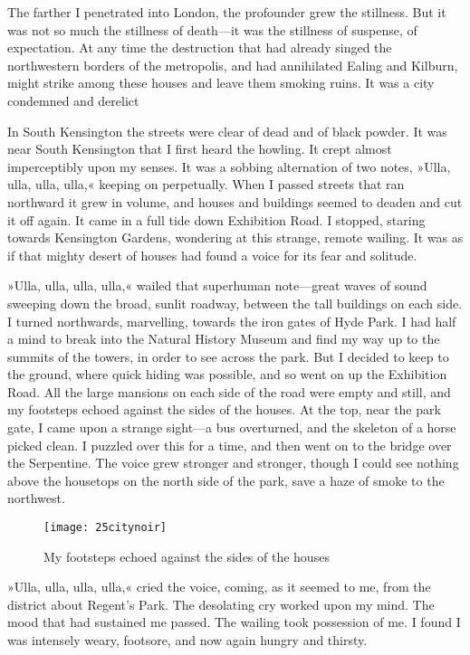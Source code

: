 The farther I penetrated into London, the profounder grew the stillness. But it was not so much the stillness of death—it was the stillness of suspense, of expectation. At any time the destruction that had already singed the northwestern borders of the metropolis, and had annihilated Ealing and Kilburn, might strike among these houses and leave them smoking ruins. It was a city condemned and derelict\textellipsis

In South Kensington the streets were clear of dead and of black powder. It was near South Kensington that I first heard the howling. It crept almost imperceptibly upon my senses. It was a sobbing alternation of two notes, »Ulla, ulla, ulla, ulla,« keeping on perpetually. When I passed streets that ran northward it grew in volume, and houses and buildings seemed to deaden and cut it off again. It came in a full tide down Exhibition Road. I stopped, staring towards Kensington Gardens, wondering at this strange, remote wailing. It was as if that mighty desert of houses had found a voice for its fear and solitude.

»Ulla, ulla, ulla, ulla,« wailed that superhuman note—great waves of sound sweeping down the broad, sunlit roadway, between the tall buildings on each side. I turned northwards, marvelling, towards the iron gates of Hyde Park. I had half a mind to break into the Natural History Museum and find my way up to the summits of the towers, in order to see across the park. But I decided to keep to the ground, where quick hiding was possible, and so went on up the Exhibition Road. All the large mansions on each side of the road were empty and still, and my footsteps echoed against the sides of the houses. At the top, near the park gate, I came upon a strange sight—a bus overturned, and the skeleton of a horse picked clean. I puzzled over this for a time, and then went on to the bridge over the Serpentine. The voice grew stronger and stronger, though I could see nothing above the housetops on the north side of the park, save a haze of smoke to the northwest.

\begin{figure}[p]
\centering
\texttt{[image: 25citynoir]}
\caption{My footsteps echoed against the sides of the houses}
\end{figure}

»Ulla, ulla, ulla, ulla,« cried the voice, coming, as it seemed to me, from the district about Regent's Park. The desolating cry worked upon my mind. The mood that had sustained me passed. The wailing took possession of me. I found I was intensely weary, footsore, and now again hungry and thirsty.

